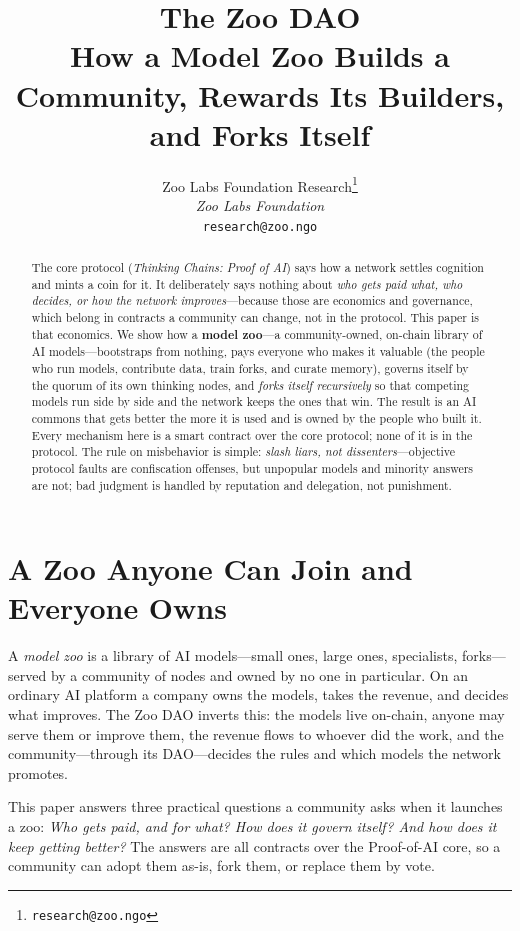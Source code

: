 \documentclass[11pt]{article}
\title{\textbf{\Huge The Zoo DAO}\\[4pt]
\large How a Model Zoo Builds a Community, Rewards Its Builders,\\ and Forks Itself}
\author{Zoo Labs Foundation Research\thanks{\texttt{research@zoo.ngo}}\\
\textit{Zoo Labs Foundation}\\ \texttt{research@zoo.ngo}}
\date{}
\begin{document}
\maketitle

\begin{abstract}
\noindent
The core protocol (\emph{Thinking Chains: Proof of AI}) says how a network settles cognition and mints a coin for it. It deliberately says nothing about \emph{who gets paid what, who decides, or how the network improves}---because those are economics and governance, which belong in contracts a community can change, not in the protocol. This paper is that economics. We show how a \textbf{model zoo}---a community-owned, on-chain library of AI models---bootstraps from nothing, pays everyone who makes it valuable (the people who run models, contribute data, train forks, and curate memory), governs itself by the quorum of its own thinking nodes, and \emph{forks itself recursively} so that competing models run side by side and the network keeps the ones that win. The result is an AI commons that gets better the more it is used and is owned by the people who built it. Every mechanism here is a smart contract over the core protocol; none of it is in the protocol. The rule on misbehavior is simple: \emph{slash liars, not dissenters}---objective protocol faults are confiscation offenses, but unpopular models and minority answers are not; bad judgment is handled by reputation and delegation, not punishment.
\end{abstract}

\section{A Zoo Anyone Can Join and Everyone Owns}

A \emph{model zoo} is a library of AI models---small ones, large ones, specialists, forks---served by a community of nodes and owned by no one in particular. On an ordinary AI platform a company owns the models, takes the revenue, and decides what improves. The Zoo DAO inverts this: the models live on-chain, anyone may serve them or improve them, the revenue flows to whoever did the work, and the community---through its DAO---decides the rules and which models the network promotes.

This paper answers three practical questions a community asks when it launches a zoo: \emph{Who gets paid, and for what? How does it govern itself? And how does it keep getting better?} The answers are all contracts over the Proof-of-AI core, so a community can adopt them as-is, fork them, or replace them by vote.
\end{document}
